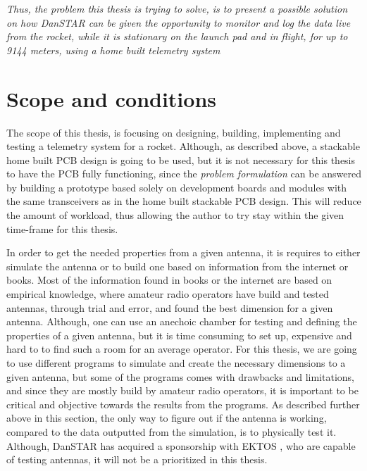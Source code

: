 \textit{Thus, the problem this thesis is trying to solve, is to present a possible solution on how DanSTAR can be given the opportunity to monitor and log the data live from the rocket, while it is stationary on the launch pad and in flight, for up to 9144 meters, using a home built telemetry system}

\section{Scope and conditions}
The scope of this thesis, is focusing on designing, building, implementing and testing a telemetry system for a rocket. Although, as described above, a stackable home built PCB design is going to be used, but it is not necessary for this thesis to have the PCB fully functioning, since the \textit{problem formulation} can be answered by building a prototype based solely on development boards and modules with the same transceivers as in the home built stackable PCB design. This will reduce the amount of workload, thus allowing the author to try stay within the given time-frame for this thesis.

In order to get the needed properties from a given antenna, it is requires to either simulate the antenna or to build one based on information from the internet or books. Most of the information found in books or the internet are based on empirical knowledge, where amateur radio operators\cite{Ham} have build and tested antennas, through trial and error, and found the best dimension for a given antenna. Although, one can use an anechoic chamber\cite{anechoic} for testing and defining the properties of a given antenna, but it is time consuming to set up, expensive and hard to to find such a room for an average operator. For this thesis, we are going to use different programs to simulate and create the necessary dimensions to a given antenna, but some of the programs comes with drawbacks and limitations, and since they are mostly build by amateur radio operators, it is important to be critical and objective towards the results from the programs. As described further above in this section, the only way to figure out if the antenna is working, compared to the data outputted from the simulation, is to physically test it. Although, DanSTAR has acquired a sponsorship with EKTOS \cite{EKTOS}, who are capable of testing antennas, it will not be a prioritized in this thesis. 


